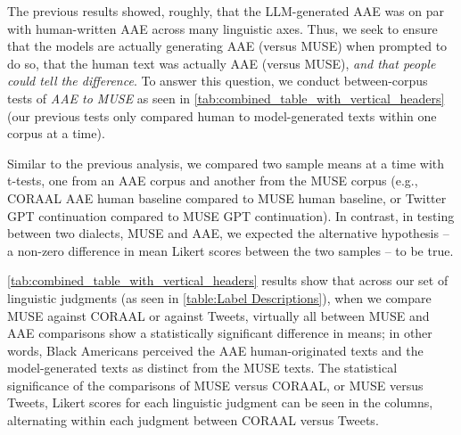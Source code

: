 The previous results showed, roughly, that the LLM-generated AAE was on par with human-written AAE across many linguistic axes.
Thus, we seek to ensure that the models are actually generating AAE (versus MUSE) when prompted to do so, that the human text was actually AAE (versus MUSE), \emph{and that people could tell the difference}. To answer this question, we conduct between-corpus tests of \emph{AAE to MUSE} as seen in \autoref{tab:combined_table_with_vertical_headers} (our previous tests only compared human to model-generated texts within one corpus at a time).

Similar to the previous analysis, we compared two sample means at a time with t-tests, one from an AAE corpus and another from the MUSE corpus (e.g., CORAAL AAE human baseline compared to MUSE human baseline, or Twitter GPT continuation compared to MUSE GPT continuation). In contrast, in testing between two dialects, MUSE and AAE, we expected the alternative hypothesis -- a non-zero difference in mean Likert scores between the two samples -- to be true.

\autoref{tab:combined_table_with_vertical_headers} results show that across our set of linguistic judgments (as seen in \autoref{table:Label Descriptions}), when we compare MUSE against CORAAL or against Tweets, virtually all between MUSE and AAE comparisons show a statistically significant difference in means; in other words, Black Americans perceived the AAE human-originated texts and the model-generated texts as distinct from the MUSE texts. The statistical significance of the comparisons of MUSE versus CORAAL, or MUSE versus Tweets, Likert scores for each linguistic judgment can be seen in the columns, alternating within each judgment between CORAAL versus Tweets.


